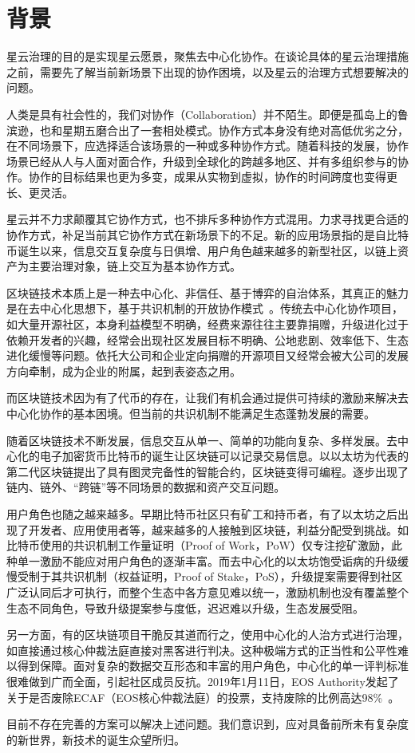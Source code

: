 \section{背景}

星云治理的目的是实现星云愿景，聚焦去中心化协作。在谈论具体的星云治理措施之前，需要先了解当前新场景下出现的协作困境，以及星云的治理方式想要解决的问题。

人类是具有社会性的，我们对协作（Collaboration）并不陌生。即便是孤岛上的鲁滨逊，也和星期五磨合出了一套相处模式。协作方式本身没有绝对高低优劣之分，在不同场景下，应选择适合该场景的一种或多种协作方式。随着科技的发展，协作场景已经从人与人面对面合作，升级到全球化的跨越多地区、并有多组织参与的协作。协作的目标结果也更为多变，成果从实物到虚拟，协作的时间跨度也变得更长、更灵活。

星云并不力求颠覆其它协作方式，也不排斥多种协作方式混用。力求寻找更合适的协作方式，补足当前其它协作方式在新场景下的不足。新的应用场景指的是自比特币诞生以来，信息交互复杂度与日俱增、用户角色越来越多的新型社区，以链上资产为主要治理对象，链上交互为基本协作方式。

区块链技术本质上是⼀种去中心化、⾮信任、基于博弈的⾃治体系，其真正的魅力是在去中⼼化思想下，基于共识机制的开放协作模式~\cite{whitepaper}。传统去中心化协作项目，如大量开源社区，本身利益模型不明确，经费来源往往主要靠捐赠，升级进化过于依赖开发者的兴趣，经常会出现社区发展目标不明确、公地悲剧、效率低下、生态进化缓慢等问题。依托大公司和企业定向捐赠的开源项目又经常会被大公司的发展方向牵制，成为企业的附属，起到表姿态之用。

而区块链技术因为有了代币的存在，让我们有机会通过提供可持续的激励来解决去中心化协作的基本困境。但当前的共识机制不能满足生态蓬勃发展的需要。

随着区块链技术不断发展，信息交互从单⼀、简单的功能向复杂、多样发展。去中心化的电子加密货币比特币的诞生让区块链可以记录交易信息。以以太坊为代表的第二代区块链提出了具有图灵完备性的智能合约，区块链变得可编程。逐步出现了链内、链外、“跨链”等不同场景的数据和资产交互问题。

用户角色也随之越来越多。早期比特币社区只有矿工和持币者，有了以太坊之后出现了开发者、应用使用者等，越来越多的人接触到区块链，利益分配受到挑战。如比特币使用的共识机制工作量证明（Proof of Work，PoW）仅专注挖矿激励，此种单一激励不能应对用户角色的逐渐丰富。而去中心化的以太坊饱受诟病的升级缓慢受制于其共识机制（权益证明，Proof of Stake，PoS），升级提案需要得到社区广泛认同后才可执行，而整个生态中各方意见难以统一，激励机制也没有覆盖整个生态不同角色，导致升级提案参与度低，迟迟难以升级，生态发展受阻。

另一方面，有的区块链项目干脆反其道而行之，使用中心化的人治方式进行治理，如直接通过核心仲裁法庭直接对黑客进行判决。这种极端方式的正当性和公平性难以得到保障。面对复杂的数据交互形态和丰富的用户角色，中心化的单一评判标准很难做到广而全面，引起社区成员反抗。2019年1月11日，EOS Authority发起了关于是否废除ECAF（EOS核心仲裁法庭）的投票，支持废除的比例高达98\%~\cite{DeleteECAF}。

目前不存在完善的方案可以解决上述问题。我们意识到，应对具备前所未有复杂度的新世界，新技术的诞生众望所归。

